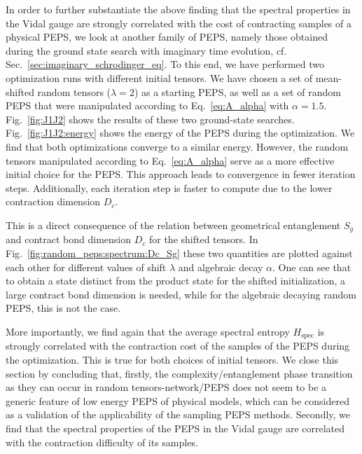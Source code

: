 \documentclass[aps,notitlepage,twocolumn,nofootinbib,superscriptaddress,pra,10pt]{revtex4-2}
\begin{document}

In order to further substantiate the above finding that the spectral properties in the Vidal gauge are strongly correlated with the cost of contracting samples of a physical PEPS, we look at another family of PEPS, namely those obtained during the ground state search with imaginary time evolution, cf. Sec.~\ref{sec:imaginary_schrodinger_eq}. 
To this end, we have performed two optimization runs with different initial tensors. 
We have chosen a set of mean-shifted random tensors ($\lambda = 2$) as a starting PEPS, as well as a set of random PEPS that were manipulated according to Eq.~\eqref{eq:A_alpha} with $\alpha=1.5$. 
Fig.~\ref{fig:J1J2} shows the results of these two ground-state searches. Fig.~\ref{fig:J1J2:energy}  shows the energy of the PEPS during the optimization.
We find that both optimizations converge to a similar energy. However, the random tensors manipulated according to Eq.~\eqref{eq:A_alpha} serve as a more effective initial choice for the PEPS. This approach leads to convergence in fewer iteration steps. Additionally, each iteration step is faster to compute due to the lower contraction dimension $D_c$.


This is a direct consequence of the relation between geometrical entanglement $S_g$ and contract bond dimension $D_c$ for the shifted tensors. In Fig.~\ref{fig:random_peps:spectrum:Dc_Sg} these two quantities are plotted against each other for different values of shift $\lambda$ and algebraic decay $\alpha$. One can see that to obtain a state distinct from the product state for the shifted initialization, a large contract bond dimension is needed, while for the algebraic decaying random PEPS, this is not the case.

More importantly, we find again that the average spectral entropy $H_\text{spec}$ is strongly correlated with the contraction cost of the samples of the PEPS during the optimization. This is true for both choices of initial tensors.
We close this section by concluding that, firstly, the complexity/entanglement phase transition as they can occur in random tensors-network/PEPS does not seem to be a generic feature of low energy PEPS of physical models, which can be considered as a validation of the applicability of the sampling PEPS methods. Secondly, we find that the spectral properties of the PEPS in the Vidal gauge are correlated with the contraction difficulty of its samples.
\end{document}
